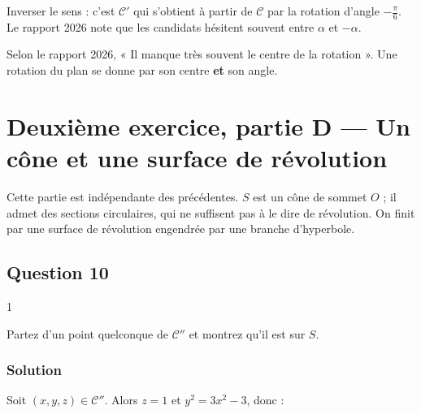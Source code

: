 \documentclass[11pt,a4paper]{article}
\newcommand{\equationajustee}[1]{%
  \sbox{\boiteequation}{$\displaystyle #1$}%
  \ifdim\wd\boiteequation>\linewidth
    \[\resizebox{\linewidth}{!}{\usebox{\boiteequation}}\]%
  \else
    \[#1\]%
  \fi}
\begin{document}
\begin{piege}

Inverser le sens : c'est \(\mathcal{C}'\) qui s'obtient à partir de \(\mathcal{C}\) par la rotation d'angle \(-\frac\pi6\). Le rapport 2026 note que les candidats hésitent souvent entre \(\alpha\) et \(-\alpha\).

\end{piege}

\begin{jury}

Selon le rapport 2026, « Il manque très souvent le centre de la rotation ». Une rotation du plan se donne par son centre \textbf{et} son angle.

\end{jury}

\hypertarget{deuxiuxe8me-exercice-partie-d-un-cuxf4ne-et-une-surface-de-ruxe9volution}{%
\section{Deuxième exercice, partie D --- Un cône et une surface de révolution}\label{deuxiuxe8me-exercice-partie-d-un-cuxf4ne-et-une-surface-de-ruxe9volution}}

Cette partie est indépendante des précédentes. \(S\) est un cône de sommet \(O\) ; il admet des sections circulaires, qui ne suffisent pas à le dire de révolution. On finit par une surface de révolution engendrée par une branche d'hyperbole.

\hypertarget{question-10-1}{%
\subsection{Question 10}\label{question-10-1}}

\begin{indication}{1}

Partez d'un point quelconque de \(\mathcal{C}''\) et montrez qu'il est sur \(S\).

\end{indication}

\hypertarget{solution-31}{%
\subsubsection{Solution}\label{solution-31}}

Soit \((x,y,z)\in\mathcal{C}''\). Alors \(z=1\) et \(y^2=3x^2-3\), donc :

\equationajustee{-3x^2+y^2+3z^2=-3x^2+(3x^2-3)+3=0.}
\end{document}
